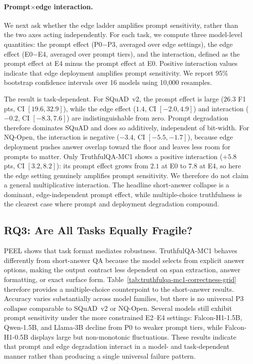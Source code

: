 \documentclass[letterpaper]{article} %
\begin{document}
\paragraph{Prompt$\times$edge interaction.}
We next ask whether the edge ladder amplifies prompt sensitivity, rather than the two axes acting independently. For each task, we compute three model-level quantities: the prompt effect (P0$-$P3, averaged over edge settings), the edge effect (E0$-$E4, averaged over prompt tiers), and the interaction, defined as the prompt effect at E4 minus the prompt effect at E0. Positive interaction values indicate that edge deployment amplifies prompt sensitivity. We report 95\% bootstrap confidence intervals over 16 models using 10{,}000 resamples.

The result is task-dependent. For SQuAD~v2, the prompt effect is large ($26.3$ F1 pts, CI $[19.6, 32.9]$), while the edge effect ($1.4$, CI $[-2.0, 4.9]$) and interaction ($-0.2$, CI $[-8.3, 7.6]$) are indistinguishable from zero. Prompt degradation therefore dominates SQuAD and does so additively, independent of bit-width. For NQ-Open, the interaction is negative ($-3.4$, CI $[-5.5, -1.7]$), because edge deployment pushes answer overlap toward the floor and leaves less room for prompts to matter. Only TruthfulQA-MC1 shows a positive interaction ($+5.8$ pts, CI $[3.2, 8.2]$): its prompt effect grows from $2.1$ at E0 to $7.8$ at E4, so here the edge setting genuinely amplifies prompt sensitivity. We therefore do not claim a general multiplicative interaction. The headline short-answer collapse is a dominant, edge-independent prompt effect, while multiple-choice truthfulness is the clearest case where prompt and deployment degradation compound.

\subsection{RQ3: Are All Tasks Equally Fragile?}
\label{sec:task-fragility-results}

PEEL shows that task format mediates robustness. TruthfulQA-MC1 behaves
differently from short-answer QA because the model selects from explicit answer
options, making the output contract less dependent on span extraction, answer
formatting, or exact surface form. Table~\ref{tab:truthfulqa-mc1-correctness-grid}
therefore provides a multiple-choice counterpoint to the short-answer results.
Accuracy varies substantially across model families, but there is no universal
P3 collapse comparable to SQuAD~v2 or NQ-Open. Several models still exhibit
prompt sensitivity under the more constrained E2--E4 settings: Falcon-H1-1.5B,
Qwen-1.5B, and Llama-3B decline from P0 to weaker prompt tiers, while
Falcon-H1-0.5B displays large but non-monotonic fluctuations. These results
indicate that prompt and edge degradation interact in a model- and
task-dependent manner rather than producing a single universal failure pattern.
\end{document}
